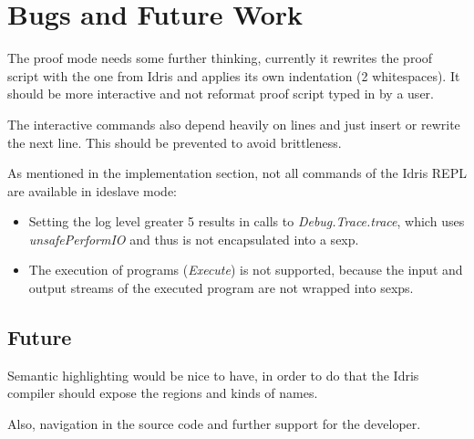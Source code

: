 \documentclass{article}
\begin{document}
\section{Bugs and Future Work}
The proof mode needs some further thinking, currently it rewrites the proof script with the one from Idris and applies its own indentation (2 whitespaces).
It should be more interactive and not reformat proof script typed in by a user.

The interactive commands also depend heavily on lines and just insert or rewrite the next line.
This should be prevented to avoid brittleness.

As mentioned in the implementation section, not all commands of the Idris REPL are available in ideslave mode:
\begin{itemize}
\item Setting the log level greater 5 results in calls to \emph{Debug.Trace.trace}, which uses \emph{unsafePerformIO} and thus is not encapsulated into a sexp.
\item The execution of programs (\emph{Execute}) is not supported, because the input and output streams of the executed program are not wrapped into sexps.
\end{itemize}

\subsection{Future}
Semantic highlighting would be nice to have, in order to do that the Idris compiler should expose the regions and kinds of names.

Also, navigation in the source code and further support for the developer.
\end{document}
